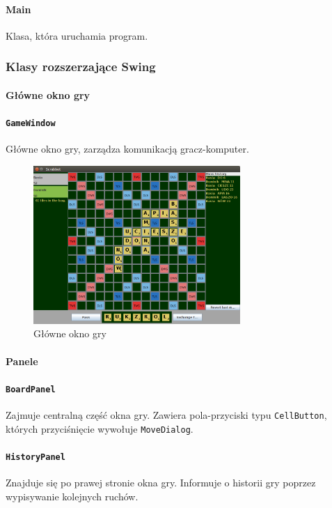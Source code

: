 \documentclass[a4paper]{article}
\begin{document}
\paragraph{Main}
Klasa, która uruchamia program.

\newpage
\subsubsection{Klasy rozszerzające Swing}
\paragraph{Główne okno gry}
\paragraph{\texttt{GameWindow}} Główne okno gry, zarządza komunikacją gracz-komputer.

\begin{figure}[!ht]
\centering
\includegraphics[width=0.7\textwidth]{1.png}
\caption{Główne okno gry}

\end{figure}
\paragraph{Panele}
\paragraph{\texttt{BoardPanel}} Zajmuje centralną część okna gry. Zawiera pola-przyciski typu \texttt{CellButton}, których przyciśnięcie wywołuje \texttt{MoveDialog}.
\paragraph{\texttt{HistoryPanel}} Znajduje się po prawej stronie okna gry. Informuje o historii gry poprzez wypisywanie kolejnych ruchów.
\end{document}
